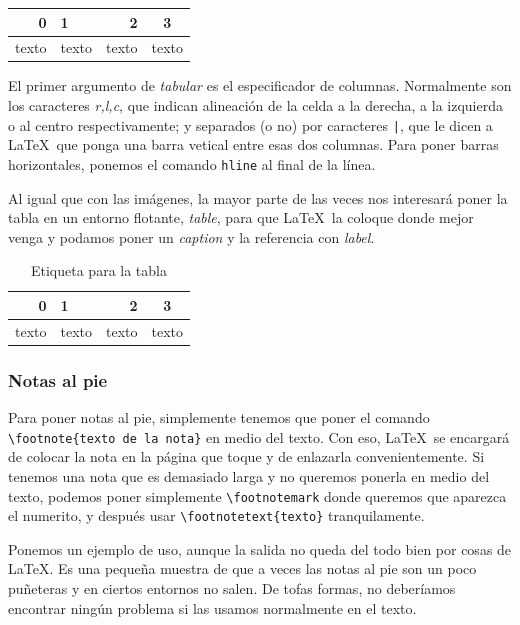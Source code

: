 \begin{LTXexample}[pos=r]
\begin{tabular}{rl|r|c||}
0 & 1 & 2 & 3 \\ \hline
texto & texto & texto & texto
\end{tabular}
\end{LTXexample}

El primer argumento de \textit{tabular} es el especificador de columnas. Normalmente son los caracteres \textit{r,l,c}, que indican alineación de la celda a la derecha, a la izquierda o al centro respectivamente; y separados (o no) por caracteres \texttt{|}, que le dicen a \LaTeX\ que ponga una barra vetical entre esas dos columnas. Para poner barras horizontales, ponemos el comando \texttt{hline} al final de la línea.

Al igual que con las imágenes, la mayor parte de las veces nos interesará poner la tabla en un entorno flotante, \textit{table}, para que \LaTeX\ la coloque donde mejor venga y podamos poner un \textit{caption} y la referencia con \textit{label}.

\begin{LTXexample}[pos=r]
\begin{table}[hbtp]
\centering
\begin{tabular}{rl|r|c||}
0 & 1 & 2 & 3 \\ \hline
texto & texto & texto & texto
\end{tabular}
\caption{Etiqueta para la tabla}
\label{tbl:TablaEjemplo}
\end{table}
\end{LTXexample}

\subsubsection{Notas al pie}

Para poner notas al pie, simplemente tenemos que poner el comando \verb|\footnote{texto de la nota}| en medio del texto. Con eso, \LaTeX\ se encargará de colocar la nota en la página que toque y de enlazarla convenientemente. Si tenemos una nota que es demasiado larga y no queremos ponerla en medio del texto, podemos poner simplemente \verb|\footnotemark| donde queremos que aparezca el numerito, y después usar \verb|\footnotetext{texto}| tranquilamente.

Ponemos un ejemplo de uso, aunque la salida no queda del todo bien por cosas de \LaTeX. Es una pequeña muestra de que a veces las notas al pie son un poco puñeteras y en ciertos entornos no salen. De tofas formas, no deberíamos encontrar ningún problema si las usamos normalmente en el texto.

